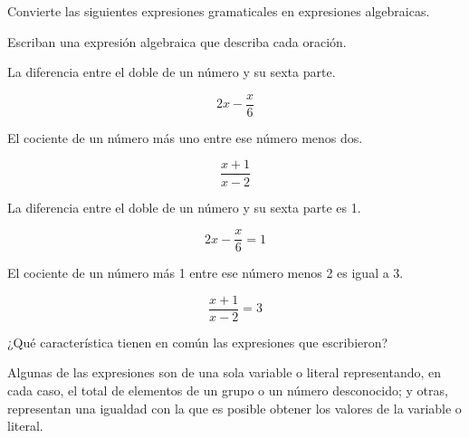 Convierte las siguientes expresiones gramaticales en expresiones algebraicas.

\begin{parts}
    Escriban una expresión algebraica que describa cada oración.

    \begin{subparts}
        \subpart La diferencia entre el doble de un número y su sexta parte.

        \begin{solutionbox}{1.6cm}
            \[2x-\dfrac{x}{6}\]
        \end{solutionbox}

        \subpart El cociente de un número más uno entre ese número menos dos.

        \begin{solutionbox}{1.6cm}
            \[\dfrac{x+1}{x-2}\]
        \end{solutionbox}

        \subpart La diferencia entre el doble de un número y su sexta parte es 1.

        \begin{solutionbox}{1.6cm}
            \[2x-\dfrac{x}{6}=1\]
        \end{solutionbox}

        \subpart El cociente de un número más 1 entre ese número menos 2 es igual a 3.

        \begin{solutionbox}{1.6cm}
            \[\dfrac{x+1}{x-2}=3\]
        \end{solutionbox}
    \end{subparts}

    ¿Qué característica tienen en común las expresiones que escribieron?

    \begin{solutionbox}{2.5cm}
        Algunas de las expresiones son de una sola variable o literal representando,
        en cada caso, el total de elementos de un grupo o un número desconocido;
        y otras, representan una igualdad con la que es posible obtener los valores de la variable o literal.
    \end{solutionbox}
\end{parts}